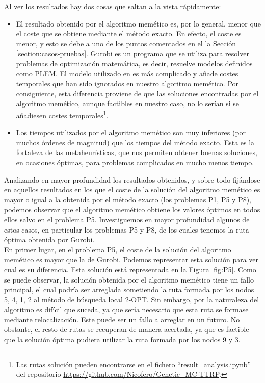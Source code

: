 Al ver los resultados hay dos cosas que saltan a la vista rápidamente:
\begin{itemize}
    \item El resultado obtenido por el algoritmo memético es, por lo general, menor que el coste que se obtiene mediante el método exacto. En efecto, el coste es menor, y esto se debe a uno de los puntos comentados en el la Sección \ref{section:casos-pruebas}. Gurobi es un programa que se utiliza para resolver problemas de optimización matemática, es decir, resuelve modelos definidos como PLEM. El modelo utilizado en \cite{laura-mcttrp} es más complicado y añade costes temporales que han sido ignorados en nuestro algoritmo memético. Por consiguiente, esta diferencia proviene de que las soluciones encontradas por el algoritmo memético, aunque factibles en nuestro caso, no lo serían si se añadiesen costes temporales\footnote{Las rutas solución pueden encontrarse en el fichero ``result\_analysis.ipynb'' del repositorio \url{https://github.com/Nicofero/Genetic_MC-TTRP}.}.
    \item Los tiempos utilizados por el algoritmo memético son muy inferiores (por muchos órdenes de magnitud) que los tiempos del método exacto. Esta es la fortaleza de las metaheurísticas, que nos permiten obtener buenas soluciones, en ocasiones óptimas, para problemas complicados en mucho menos tiempo.
\end{itemize}

Analizando en mayor profundidad los resultados obtenidos, y sobre todo fijándose en aquellos resultados en los que el coste de la solución del algoritmo memético es mayor o igual a la obtenida por el método exacto (los problemas P1, P5 y P8), podemos observar que el algoritmo memético obtiene los valores óptimos en todos ellos salvo en el problema P5. Investiguemos en mayor profundidad algunos de estos casos, en particular los problemas P5 y P8, de los cuales tenemos la ruta óptima obtenida por Gurobi.\\

En primer lugar, en el problema P5, el coste de la solución del algoritmo memético es mayor que la de Gurobi. Podemos representar esta solución para ver cual es su diferencia. Esta solución está representada en la Figura \ref{fig:P5}. Como se puede observar, la solución obtenida por el algoritmo memético tiene un fallo principal, el cual podría ser arreglada sometiendo la ruta formada por los nodos 5, 4, 1, 2 al método de búsqueda local 2-OPT. Sin embargo, por la naturaleza del algoritmo es difícil que suceda, ya que sería necesario que esta ruta se formase mediante relocalización. Este puede ser un fallo a arreglar en un futuro. No obstante, el resto de rutas se recuperan de manera acertada, ya que es factible que la solución óptima pudiera utilizar la ruta formada por los nodos 9 y 3.\\

